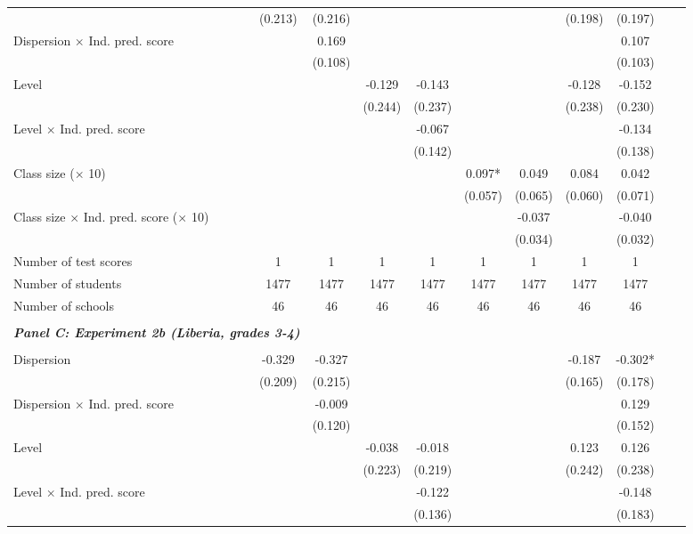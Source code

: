 \begin{center}
\begin{scriptsize}
\begin{threeparttable}
\begin{tabular} {@{} l l c c c c c c c c c c  @{}}
                 &  & (0.213) & (0.216) &  &  &  &  & (0.198) & (0.197) \\
Dispersion $\times$ Ind. pred. score &  &  & 0.169 &  &  &  &  &  & 0.107 \\
                 &  &  & (0.108) &  &  &  &  &  & (0.103) \\
Level &  &  &  & -0.129 & -0.143 &  &  & -0.128 & -0.152 \\
                 &  &  &  & (0.244) & (0.237) &  &  & (0.238) & (0.230) \\
Level $\times$ Ind. pred. score &  &  &  &  & -0.067 &  &  &  & -0.134 \\
                 &  &  &  &  & (0.142) &  &  &  & (0.138) \\
Class size ($\times$ 10) &  &  &  &  &  & 0.097* & 0.049 & 0.084 & 0.042 \\
                 &  &  &  &  &  & (0.057) & (0.065) & (0.060) & (0.071) \\
Class size $\times$ Ind. pred. score ($\times$ 10) &  &  &  &  &  &  & -0.037 &  & -0.040 \\
                 &  &  &  &  &  &  & (0.034) &  & (0.032) \\
\midrule
Number of test scores &  & 1 & 1 & 1 & 1 & 1 & 1 & 1 & 1 \\
Number of students &  & 1477 & 1477 & 1477 & 1477 & 1477 & 1477 & 1477 & 1477 \\
Number of schools &  & 46 & 46 & 46 & 46 & 46 & 46 & 46 & 46 \\
 \midrule
\\
\multicolumn{3}{l}{\textbf{\textit{Panel C: Experiment 2b (Liberia, grades 3-4)}}} \\
\\
Dispersion &  & -0.329 & -0.327 &  &  &  &  & -0.187 & -0.302* \\
                 &  & (0.209) & (0.215) &  &  &  &  & (0.165) & (0.178) \\
Dispersion $\times$ Ind. pred. score &  &  & -0.009 &  &  &  &  &  & 0.129 \\
                 &  &  & (0.120) &  &  &  &  &  & (0.152) \\
Level &  &  &  & -0.038 & -0.018 &  &  & 0.123 & 0.126 \\
                 &  &  &  & (0.223) & (0.219) &  &  & (0.242) & (0.238) \\
Level $\times$ Ind. pred. score &  &  &  &  & -0.122 &  &  &  & -0.148 \\
                 &  &  &  &  & (0.136) &  &  &  & (0.183) \\

\end{tabular}
\end{threeparttable}
\end{scriptsize}
\end{center}

